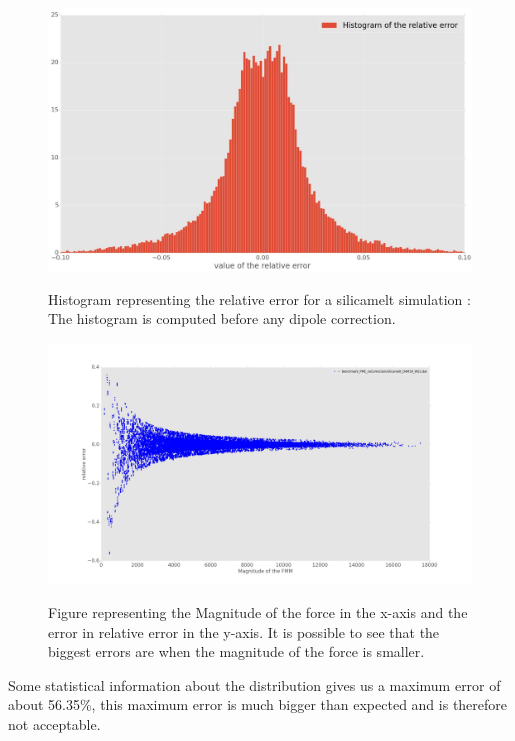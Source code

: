 \documentclass[12pt,twoside,a4paper]{report}
\begin{document}
\begin{figure}[H]
  \label{hist_correction} 
   \includegraphics[scale=0.35]{hist_nocorrection.jpeg}
   \label{hist_correction} 
    \centering 
    \caption{Histogram representing the relative error for a silicamelt simulation : The histogram is computed before any dipole correction.}   
  \label{hist_correction} 
   \end{figure}   


	\begin{figure}[H]
	
	\includegraphics[scale=0.23]{magErr_noCorrection.jpeg}
	 \label{fig:mag_noCorr}  
	\centering 
    \caption{Figure representing the Magnitude of the force in the x-axis and the  error in relative error in the y-axis. It is possible to see that the biggest errors are when the magnitude of the force is smaller.}    
	 \label{fig:mag_noCorr}     
      \end{figure}  


	Some statistical information about the distribution gives us a maximum error of about 56.35\%, this maximum error is much bigger than expected and is therefore not acceptable.\\
	
\end{document}
